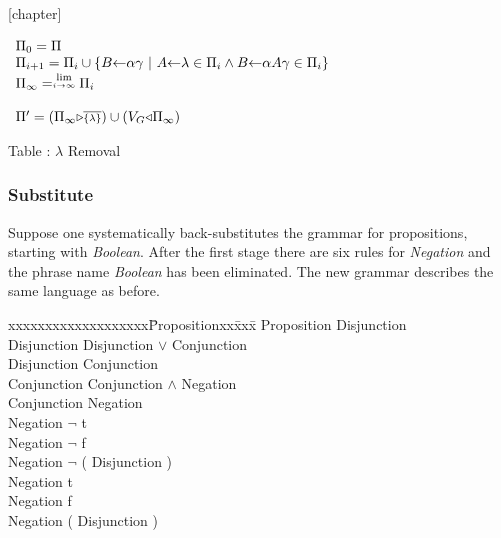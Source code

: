 \begin{enumerate}
{}[chapter]
\setcounter{Erasure}{\value{table}}
\begin{samepage}
\begin{center}$
\begin{array}{l}
    \Pi_0 = \Pi                                                  \\
    \Pi_{i+1} = \Pi_i \cup \{ 
         B \la\alpha\gamma\ |\  
         A \la \lambda \in \Pi_i \wedge
         B \la \alpha A\gamma \in \Pi_i\}                        \\
 \Pi_\infty = \stackrel{\rm lim}{\scriptscriptstyle i\rightarrow\infty}\Pi_i  \\
                                                               \\
    \Pi' = (\Pi_\infty \Rstrict {\scriptstyle\overline{\{\lambda\}}})
    \cup (V_G\Dstrict \Pi_\infty)

\end{array}
$
\end{center}

\begin{center}
Table \thetable: $\lambda$ Removal
\end{center}
\end{samepage}

\subsubsection{Substitute}
Suppose one systematically back-substitutes the grammar for
propositions, starting with {\em Boolean}.  
After the first stage there are six rules for {\em Negation} 
and the phrase name {\em Boolean} has been eliminated.  
The new grammar describes the same language as before.

\begin{samepage}
\begin{em}
\begin{tabbing}
xxxxxxxxxxxxxxxxxxx\=Propositionxx\=xxx\=\kill
\>Proposition \>\la\> Disjunction                        \\        
\>Disjunction \>\la\> Disjunction $\vee$ Conjunction     \\
\>Disjunction \>\la\> Conjunction                        \\
\>Conjunction \>\la\> Conjunction $\wedge$ Negation      \\
\>Conjunction \>\la\> Negation                           \\
\>Negation    \>\la\> $\neg$ {\rm t}                     \\
\>Negation    \>\la\> $\neg$ {\rm f}                     \\
\>Negation    \>\la\> $\neg$ {\rm(} Disjunction {\rm)}   \\
\>Negation    \>\la\> {\rm t}                     \\
\>Negation    \>\la\> {\rm f}                     \\
\>Negation    \>\la\> {\rm(} Disjunction {\rm)}   \\
\end{tabbing}
\end{em}
\end{samepage}


\end{enumerate}
